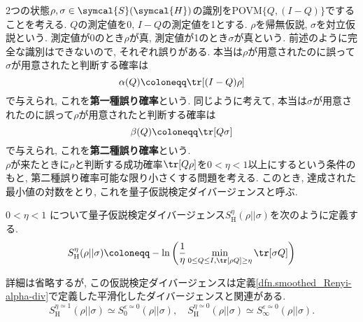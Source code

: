 

2つの状態$\rho, \sigma\in\symcal{S}(\symcal{H})$の識別をPOVM$\{Q, (I-Q)\}$ですることを考える. 
$Q$の測定値を0, $I-Q$の測定値を1とする. 
$\rho$を帰無仮説, $\sigma$を対立仮説という. 
測定値が0のとき$\rho$が真, 測定値が1のとき$\sigma$が真という. 
前述のように完全な識別はできないので, それぞれ誤りがある. 
本当は$\rho$が用意されたのに誤って$\sigma$が用意されたと判断する確率は
\begin{equation}
  \alpha(Q)\coloneqq\tr[(I-Q)\rho]
\end{equation}
で与えられ, これを\textbf{第一種誤り確率}という. 
同じように考えて, 本当は$\sigma$が用意されたのに誤って$\rho$が用意されたと判断する確率は
\begin{equation}
  \beta(Q)\coloneqq \tr[Q\sigma]
\end{equation}
で与えられ, これを\textbf{第二種誤り確率}という. \\

$\rho$が来たときに$\rho$と判断する成功確率$\tr[Q\rho]$を$0<\eta<1$以上にするという条件のもと, 第二種誤り確率可能な限り小さくする問題を考える. 
このとき, 達成された最小値の対数をとり, これを量子仮説検定ダイバージェンスと呼ぶ. 
\begin{mydfn}[量子仮説検定ダイバージェンス]
  $0<\eta<1$ について量子仮説検定ダイバージェンス$S_{\text{H}}^\eta(\rho||\sigma)$を次のように定義する. 
  \begin{equation}
    S_{\text{H}}^\eta(\rho||\sigma)\coloneqq -\ln\left( \frac{1}{\eta}\min_{0\leq Q\leq I, \tr[\rho Q]\geq \eta} \tr[\sigma Q]\right)
  \end{equation}
\end{mydfn}

詳細は省略するが, この仮説検定ダイバージェンスは定義\ref{dfn.smoothed_Renyi-alpha-div}で定義した平滑化したダイバージェンスと関連がある. 
\begin{equation}
  S_{\text{{H}}}^{\eta\simeq 1}(\rho||\sigma)\simeq S_0^{\varepsilon\simeq 0}(\rho||\sigma),\quad S_{\text{{H}}}^{\eta\simeq 0}(\rho||\sigma)\simeq S_\infty^{\varepsilon\simeq 0}(\rho||\sigma). 
\end{equation}

